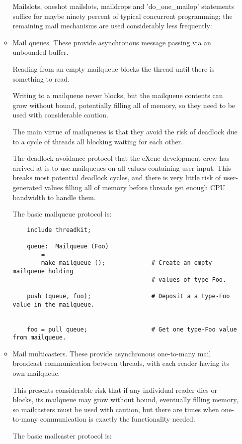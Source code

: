 \begin{itemize}
\begin{itemize}
Mailslots, oneshot mailslots, 
maildrops and 'do\_one\_mailop' statements 
suffice for maybe ninety percent of typical 
 concurrent programming;  the 
remaining mail mechanisms are used 
considerably less frequently: 

\item 
Mail queues.  These provide asynchronous 
message passing via an unbounded buffer. 

Reading from an empty mailqueue blocks 
the thread until there is something to 
read. 

Writing to a mailqueue never blocks, 
but the mailqueue contents can grow without 
bound, potentially filling all of memory, 
so they need to be used with considerable 
caution. 

The main virtue of mailqueues is that they 
avoid the risk of deadlock due to a cycle 
of threads all blocking waiting for each 
other. 

The deadlock-avoidance protocol that the 
eXene development crew has arrived at is 
to use mailqueues on all values containing 
user input.  This breaks most potential 
deadlock cycles, and there is very little 
risk of user-generated values filling all 
of memory before threads get enough CPU 
bandwidth to handle them. 

The basic mailqueue protocol is: 

\begin{verbatim}
    include threadkit;

    queue:  Mailqueue (Foo)
        =
        make_mailqueue ();             # Create an empty mailqueue holding
                                       # values of type Foo.

    push (queue, foo);                 # Deposit a a type-Foo value in the mailqueue.


    foo = pull queue;                  # Get one type-Foo value from mailqueue.
\end{verbatim}


\item 
Mail multicasters.  These provide asynchronous 
one-to-many mail broadcast communication between 
threads, with each reader having its own mailqueue. 

This presents considerable risk that if any individual 
reader dies or blocks, its mailqueue may grow without 
bound, eventually filling memory, so mailcasters must 
be used with caution, but there are times when one-to-many 
communication is exactly the functionality needed. 

The basic mailcaster protocol is: 


\end{itemize}
\end{itemize}
